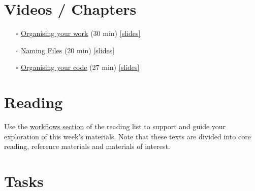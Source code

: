 \documentclass[
  letterpaper,
  DIV=11,
  numbers=noendperiod]{scrreprt}
\providecommand{\tightlist}{%
  \setlength{\itemsep}{0pt}\setlength{\parskip}{0pt}}\usepackage{longtable,booktabs,array}
\begin{document}

\section*{Videos / Chapters}\label{videos-chapters}


\begin{itemize}
\tightlist
\item[$\square$]
  \href{https://imperial.cloud.panopto.eu/Panopto/Pages/Viewer.aspx?id=eb93df23-751e-4f79-8397-af72013634d0}{Organising
  your work} (30 min)
  \href{https://github.com/zakvarty/effective-data-science-slides-2022/raw/main/01-01-organising-your-work/01-01-organising-your-work.pdf}{{[}slides{]}}
\item[$\square$]
  \href{https://imperial.cloud.panopto.eu/Panopto/Pages/Viewer.aspx?id=0f676fbc-3de6-490a-ac38-af7200ee1396}{Naming
  Files} (20 min)
  \href{https://github.com/zakvarty/effective-data-science-slides-2022/raw/main/01-02-naming-files/01-02-naming-files.pdf}{{[}slides{]}}
\item[$\square$]
  \href{https://imperial.cloud.panopto.eu/Panopto/Pages/Viewer.aspx?id=572c25c0-4cac-4260-97fe-af7200ee1358}{Organising
  your code} (27 min)
  \href{https://github.com/zakvarty/effective-data-science-slides-2022/raw/main/01-03-organising-your-code/01-03-organising-your-code.pdf}{{[}slides{]}}
\end{itemize}

\section*{Reading}\label{reading}


Use the \hyperref[workflows-reading]{workflows section} of the reading
list to support and guide your exploration of this week's materials.
Note that these texts are divided into core reading, reference materials
and materials of interest.

\section*{Tasks}\label{tasks}

\end{document}
